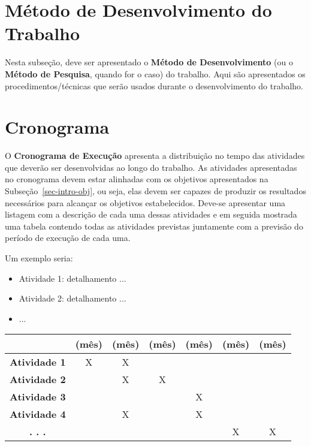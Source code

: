 

\section{Método de Desenvolvimento do Trabalho}
\label{sec-intro-met}

Nesta subseção, deve ser apresentado o \textbf{Método de Desenvolvimento} (ou o \textbf{Método de Pesquisa}, quando for o caso) do trabalho. Aqui são apresentados os procedimentos/técnicas que serão usados durante o desenvolvimento do trabalho. 

\section{Cronograma}
\label{sec-intro-crono}

O \textbf{Cronograma de Execução} apresenta a distribuição no tempo das atividades
que deverão ser desenvolvidas ao longo do trabalho. As atividades apresentadas no cronograma devem estar alinhadas com os objetivos apresentados na Subseção~\ref{sec-intro-obj}, ou seja, elas devem ser capazes de produzir os resultados necessários para alcançar os objetivos estabelecidos. Deve-se apresentar uma listagem com a descrição de cada uma dessas atividades e em seguida mostrada uma tabela contendo todas as atividades previstas juntamente com a  previsão do período de execução de cada uma.

Um exemplo seria:
\begin{itemize}
\item Atividade 1: detalhamento ...
\item Atividade 2: detalhamento ...
\item ...
\end{itemize}

\begin{table}[h]
\centering
\begin{tabular}{c|c|c|c|c|c|c|}
\cline{2-7}
\multicolumn{1}{l|}{} & \textbf{(mês)} & \textbf{(mês)} & \textbf{(mês)} & \textbf{(mês)} & \textbf{(mês)} & \textbf{(mês)} \\ \hline
\multicolumn{1}{|c|}{\textbf{Atividade 1}} & X & X &  &  &  &  \\ \hline
\multicolumn{1}{|c|}{\textbf{Atividade 2}} &  & X & X &  &  &  \\ \hline
\multicolumn{1}{|c|}{\textbf{Atividade 3}} &  &  &  & X &  &  \\ \hline
\multicolumn{1}{|c|}{\textbf{Atividade 4}} &  & X &  & X &  &  \\ \hline
\multicolumn{1}{|c|}{\textbf{. . .}} &  &  &  &  & X & X \\ \hline
\end{tabular}
\end{table}